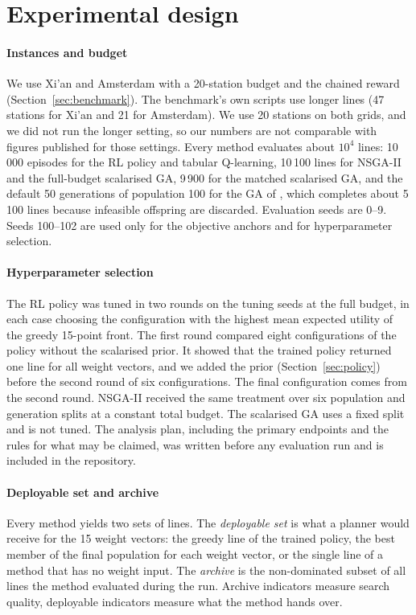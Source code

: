 \section{Experimental design}\label{sec:design}

\paragraph{Instances and budget} We use Xi'an and Amsterdam with a 20-station budget and the chained reward (Section~\ref{sec:benchmark}). The benchmark's own scripts use longer lines (47 stations for Xi'an and 21 for Amsterdam). We use 20 stations on both grids, and we did not run the longer setting, so our numbers are not comparable with figures published for those settings. Every method evaluates about $10^4$ lines: 10\,000 episodes for the RL policy and tabular Q-learning, 10\,100 lines for NSGA-II and the full-budget scalarised GA, 9\,900 for the matched scalarised GA, and the default 50 generations of population 100 for the GA of \citet{michailidis2026}, which completes about 5\,100 lines because infeasible offspring are discarded. Evaluation seeds are 0--9. Seeds 100--102 are used only for the objective anchors and for hyperparameter selection.

\paragraph{Hyperparameter selection} The RL policy was tuned in two rounds on the tuning seeds at the full budget, in each case choosing the configuration with the highest mean expected utility of the greedy 15-point front. The first round compared eight configurations of the policy without the scalarised prior. It showed that the trained policy returned one line for all weight vectors, and we added the prior (Section~\ref{sec:policy}) before the second round of six configurations. The final configuration comes from the second round. NSGA-II received the same treatment over six population and generation splits at a constant total budget. The scalarised GA uses a fixed split and is not tuned. The analysis plan, including the primary endpoints and the rules for what may be claimed, was written before any evaluation run and is included in the repository.

\paragraph{Deployable set and archive} Every method yields two sets of lines. The \emph{deployable set} is what a planner would receive for the 15 weight vectors: the greedy line of the trained policy, the best member of the final population for each weight vector, or the single line of a method that has no weight input. The \emph{archive} is the non-dominated subset of all lines the method evaluated during the run. Archive indicators measure search quality, deployable indicators measure what the method hands over.

